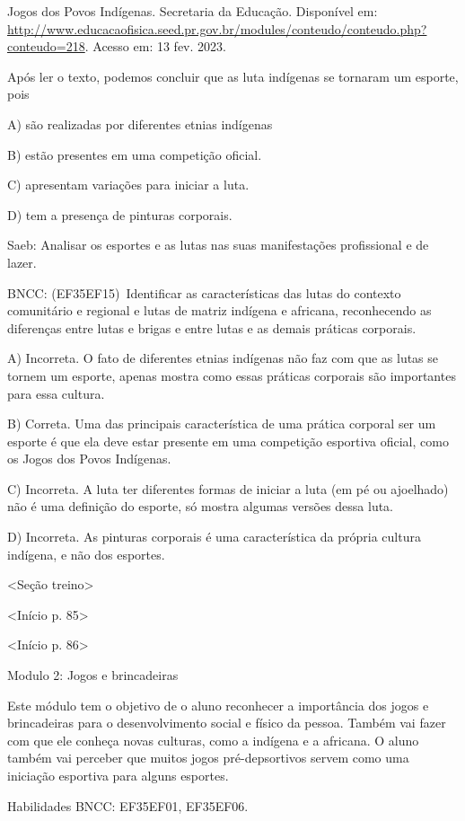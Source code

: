 Jogos dos Povos Indígenas. Secretaria da Educação. Disponível em:
\url{http://www.educacaofisica.seed.pr.gov.br/modules/conteudo/conteudo.php?conteudo=218}.
Acesso em: 13 fev. 2023.

Após ler o texto, podemos concluir que as luta indígenas se tornaram um
esporte, pois

A) são realizadas por diferentes etnias indígenas

B) estão presentes em uma competição oficial.

C) apresentam variações para iniciar a luta.

D) tem a presença de pinturas corporais.

Saeb: Analisar os esportes e as lutas nas suas manifestações
profissional e de lazer.

BNCC: (EF35EF15)~Identificar as características das lutas do contexto
comunitário e regional e lutas de matriz indígena e africana,
reconhecendo as diferenças entre lutas e brigas e entre lutas e as
demais práticas corporais.

A) Incorreta. O fato de diferentes etnias indígenas não faz com que as
lutas se tornem um esporte, apenas mostra como essas práticas corporais
são importantes para essa cultura.

B) Correta. Uma das principais característica de uma prática corporal
ser um esporte é que ela deve estar presente em uma competição esportiva
oficial, como os Jogos dos Povos Indígenas.

C) Incorreta. A luta ter diferentes formas de iniciar a luta (em pé ou
ajoelhado) não é uma definição do esporte, só mostra algumas versões
dessa luta.

D) Incorreta. As pinturas corporais é uma característica da própria
cultura indígena, e não dos esportes.

\textless{}Seção treino\textgreater{}

\textless{}Início p. 85\textgreater{}

\textless{}Início p. 86\textgreater{}

Modulo 2: Jogos e brincadeiras

Este módulo tem o objetivo de o aluno reconhecer a importância dos jogos
e brincadeiras para o desenvolvimento social e físico da pessoa. Também
vai fazer com que ele conheça novas culturas, como a indígena e a
africana. O aluno também vai perceber que muitos jogos pré-depsortivos
servem como uma iniciação esportiva para alguns esportes.

Habilidades BNCC: EF35EF01, EF35EF06.

